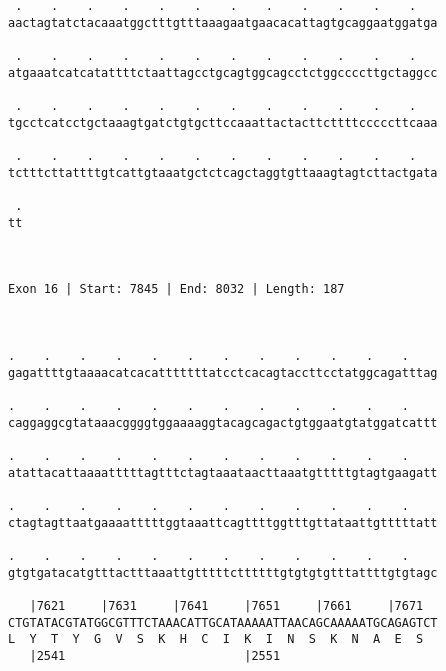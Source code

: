 \documentclass{article}
\begin{document}
\begin{Verbatim}
                                                            
  
 .    .    .    .    .    .    .    .    .    .    .    .   
aactagtatctacaaatggctttgtttaaagaatgaacacattagtgcaggaatggatga
                                                            
 .    .    .    .    .    .    .    .    .    .    .    .   
atgaaatcatcatattttctaattagcctgcagtggcagcctctggccccttgctaggcc
                                                            
 .    .    .    .    .    .    .    .    .    .    .    .   
tgcctcatcctgctaaagtgatctgtgcttccaaattactacttcttttcccccttcaaa
                                                            
 .    .    .    .    .    .    .    .    .    .    .    .   
tctttcttattttgtcattgtaaatgctctcagctaggtgttaaagtagtcttactgata
                                                            
 .
tt
  
  
 
Exon 16 | Start: 7845 | End: 8032 | Length: 187



.    .    .    .    .    .    .    .    .    .    .    .    
gagattttgtaaaacatcacatttttttatcctcacagtaccttcctatggcagatttag
                                                            
.    .    .    .    .    .    .    .    .    .    .    .    
caggaggcgtataaacggggtggaaaaggtacagcagactgtggaatgtatggatcattt
                                                            
.    .    .    .    .    .    .    .    .    .    .    .    
atattacattaaaatttttagtttctagtaaataacttaaatgtttttgtagtgaagatt
                                                            
.    .    .    .    .    .    .    .    .    .    .    .    
ctagtagttaatgaaaatttttggtaaattcagttttggtttgttataattgtttttatt
                                                            
.    .    .    .    .    .    .    .    .    .    .    .    
gtgtgatacatgtttactttaaattgtttttcttttttgtgtgtgtttattttgtgtagc
                                                            
   |7621     |7631     |7641     |7651     |7661     |7671  
CTGTATACGTATGGCGTTTCTAAACATTGCATAAAAATTAACAGCAAAAATGCAGAGTCT
L  Y  T  Y  G  V  S  K  H  C  I  K  I  N  S  K  N  A  E  S  
   |2541                         |2551                      
  

\end{Verbatim}
\end{document}
